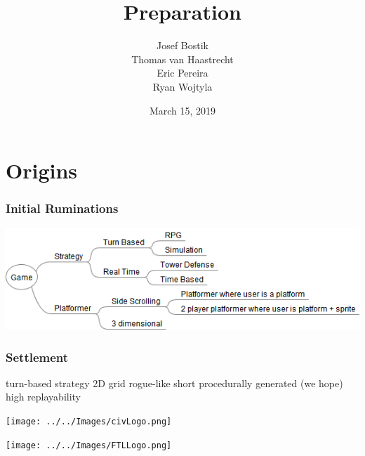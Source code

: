 \documentclass[ascpectratio=169]{beamer}
\title{Preparation}
\author[]{Josef Bostik \\
  Thomas van Haastrecht \\
  Eric Pereira \\
  Ryan Wojtyla}
\date{March 15, 2019}
\begin{document}

\begin{frame}
  \titlepage
\end{frame}


\section{Origins}


\begin{frame}

  \frametitle{Initial Ruminations}

  \begin{center}
    \includegraphics[scale=0.5]{../../Diagrams/Game/Game.png}
  \end{center}

\end{frame}



\begin{frame}

  \frametitle{Settlement}

  \begin{multicols}{2}
    
  \begin{outline}
    \1 turn-based strategy
    \1 2D grid
    \1 rogue-like
      \2 short
      \2 procedurally generated (we hope)
      \2 high replayability
  \end{outline}

  \columnbreak

  \begin{center}
    \texttt{[image: ../../Images/civLogo.png]}
  \end{center}

  \begin{center}
    \texttt{[image: ../../Images/FTLLogo.png]}
  \end{center}

  \end{multicols}

\end{frame}
\end{document}
